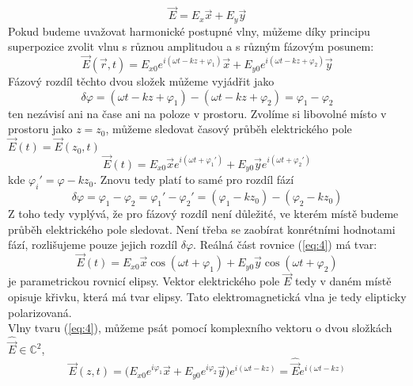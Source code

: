 \documentclass[a4paper]{article}
\numberwithin{equation}{section}
\begin{document}
    \begin{equation} \label{eq:1}
        \vec{E} = E_x\vec{x} + E_y\vec{y}
    \end{equation}
    Pokud budeme uvažovat harmonické postupné vlny, můžeme díky principu superpozice zvolit vlnu s různou
    amplitudou a s různým fázovým posunem:
    \begin{equation} \label{eq:2}
        \vec{E}(\vec{r},t) = E_{x0} e^{i(\omega t - kz + \varphi_1)} \vec{x} + 
                             E_{y0} e^{i(\omega t - kz + \varphi_2)} \vec{y}
    \end{equation}
    Fázový rozdíl těchto dvou složek můžeme vyjádřit jako 
    \begin{equation} \label{eq:3}
        \delta \varphi = (\omega t -kz + \varphi_1) - (\omega t -kz + \varphi_2) = \varphi_1 - \varphi_2
    \end{equation}
    ten nezávisí ani na čase ani na poloze v prostoru. Zvolíme si libovolné místo v prostoru jako
    $z = z_0$, můžeme sledovat časový průběh elektrického pole $\vec{E}(t) = \vec{E}(z_0,t)$
    \begin{equation} \label{eq:4}
        \vec{E}(t) = E_{x0} \vec{x} e^{i(\omega t + \varphi_1')} + E_{y0} \vec{y} e^{i(\omega t + \varphi_2')}
    \end{equation}
    kde $\varphi_i' = \varphi - kz_0$. Znovu tedy platí to samé pro rozdíl fází
    \begin{equation} \label{eq:5}
        \delta \varphi = \varphi_1 - \varphi_2 = \varphi_1' - \varphi_2' = (\varphi_1 - kz_0) - (\varphi_2 - kz_0)
    \end{equation}
    Z toho tedy vyplývá, že pro fázový rozdíl není důležité, ve kterém místě budeme průběh elektrického pole
    sledovat. Není třeba se zaobírat konrétními hodnotami fází, rozlišujeme pouze jejich rozdíl $\delta \varphi$.
    Reálná část rovnice (\ref{eq:4}) má tvar:
    \begin{equation} \label{eq:6}
        \vec{E}(t) = E_{x0}\vec{x}\cos(\omega t + \varphi_1) + E_{y0}\vec{y}\cos(\omega t + \varphi_2)
    \end{equation}
    je parametrickou rovnicí elipsy. Vektor elektrického pole $\vec{E}$ tedy v daném místě opisuje křivku,
    která má tvar elipsy. Tato elektromagnetická vlna je tedy elipticky polarizovaná. 
    \\Vlny tvaru (\ref{eq:4}), můžeme psát pomocí komplexního vektoru o dvou složkách $\hat{\vec{E}} \in \mathbb{C}^2$, 
    \begin{equation}
        \vec{E}(z,t) = \big(E_{x0} e^{i\varphi_1} \vec{x} + E_{y0} e^{i\varphi_2} \vec{y} \big)  e^{i(\omega t - kz)} = \hat{\vec{E}} e^{i(\omega t-kz)}
    \end{equation}
\end{document}
